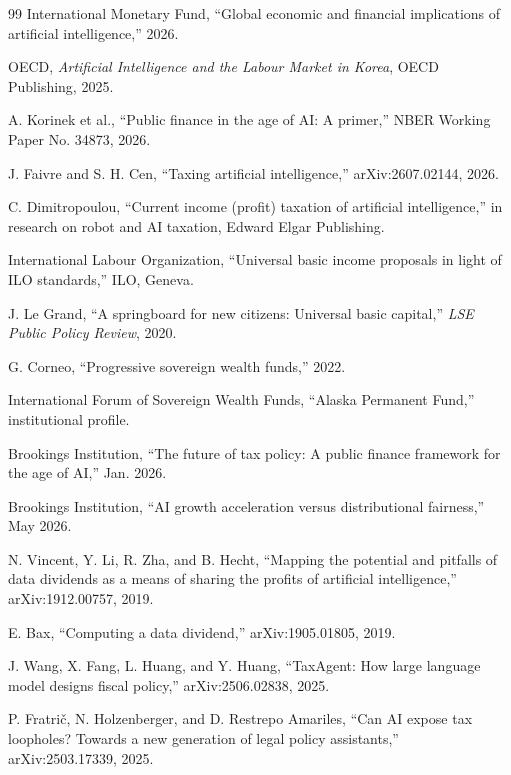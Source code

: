 \documentclass[conference]{IEEEtran}
\begin{document}
\begin{thebibliography}{99}
International Monetary Fund,
``Global economic and financial implications of artificial intelligence,''
2026.

OECD,
\textit{Artificial Intelligence and the Labour Market in Korea},
OECD Publishing, 2025.

A. Korinek et al.,
``Public finance in the age of AI: A primer,''
NBER Working Paper No. 34873, 2026.

J. Faivre and S. H. Cen,
``Taxing artificial intelligence,''
arXiv:2607.02144, 2026.

C. Dimitropoulou,
``Current income (profit) taxation of artificial intelligence,''
in research on robot and AI taxation, Edward Elgar Publishing.

International Labour Organization,
``Universal basic income proposals in light of ILO standards,''
ILO, Geneva.

J. Le Grand,
``A springboard for new citizens: Universal basic capital,''
\textit{LSE Public Policy Review}, 2020.

G. Corneo,
``Progressive sovereign wealth funds,''
2022.

International Forum of Sovereign Wealth Funds,
``Alaska Permanent Fund,'' institutional profile.

Brookings Institution,
``The future of tax policy: A public finance framework for the age of AI,''
Jan. 2026.

Brookings Institution,
``AI growth acceleration versus distributional fairness,''
May 2026.

N. Vincent, Y. Li, R. Zha, and B. Hecht,
``Mapping the potential and pitfalls of data dividends as a means of
sharing the profits of artificial intelligence,''
arXiv:1912.00757, 2019.

E. Bax,
``Computing a data dividend,''
arXiv:1905.01805, 2019.

J. Wang, X. Fang, L. Huang, and Y. Huang,
``TaxAgent: How large language model designs fiscal policy,''
arXiv:2506.02838, 2025.

P. Fratri{\v c}, N. Holzenberger, and D. Restrepo Amariles,
``Can AI expose tax loopholes? Towards a new generation of legal policy
assistants,''
arXiv:2503.17339, 2025.

\end{thebibliography}
\end{document}
